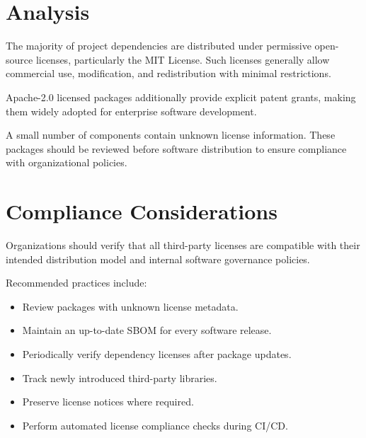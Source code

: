 \section{Analysis}

The majority of project dependencies are distributed under permissive open-source licenses, particularly the MIT License. Such licenses generally allow commercial use, modification, and redistribution with minimal restrictions.

Apache-2.0 licensed packages additionally provide explicit patent grants, making them widely adopted for enterprise software development.

A small number of components contain unknown license information. These packages should be reviewed before software distribution to ensure compliance with organizational policies.

\vspace{0.4cm}


\section{Compliance Considerations}

Organizations should verify that all third-party licenses are compatible with their intended distribution model and internal software governance policies.

Recommended practices include:
\begin{itemize}
\item Review packages with unknown license metadata.
\item Maintain an up-to-date SBOM for every software release.
\item Periodically verify dependency licenses after package updates.
\item Track newly introduced third-party libraries.
\item Preserve license notices where required.
\item Perform automated license compliance checks during CI/CD.
\end{itemize}

\vspace{0.4cm}


